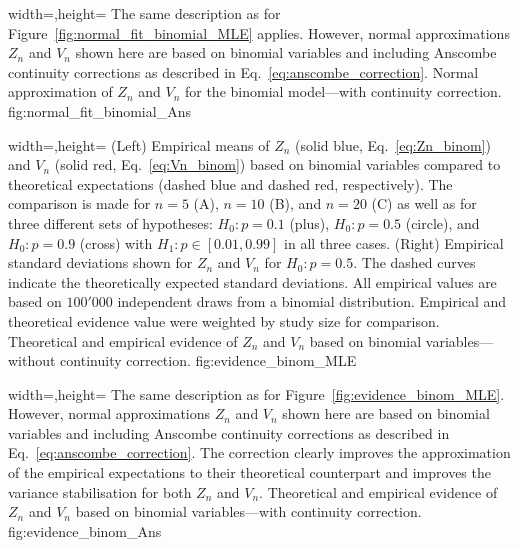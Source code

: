   {width=\textwidth,height=\textheight}%
  {The same description as for Figure~\ref{fig:normal_fit_binomial_MLE} applies. However, normal approximations $Z_n$ and $V_n$ shown here are based on binomial variables and including Anscombe continuity corrections as described in Eq.~\ref{eq:anscombe_correction}.}%
  {Normal approximation of $Z_n$ and $V_n$ for the binomial model---with continuity correction.}%
  {fig:normal_fit_binomial_Ans}%

  {width=\textwidth,height=\textheight}%
  {(Left) Empirical means of $Z_n$ (solid blue, Eq.~\ref{eq:Zn_binom}) and $V_n$ (solid red, Eq.~\ref{eq:Vn_binom}) based on binomial variables compared to theoretical expectations (dashed blue and dashed red, respectively). The comparison is made for $n=5$ (A), $n=10$ (B), and $n=20$ (C) as well as for three different sets of hypotheses: ${H_0: p=0.1}$ (plus), ${H_0: p=0.5}$ (circle), and ${H_0: p=0.9}$ (cross) with ${H_1: p \in [0.01,0.99]}$ in all three cases. (Right) Empirical standard deviations shown for $Z_n$ and $V_n$ for ${H_0: p=0.5}$. The dashed curves indicate the theoretically expected standard deviations. All empirical values are based on $100'000$ independent draws from a binomial distribution. Empirical and theoretical evidence value were weighted by study size for comparison.}%
  {Theoretical and empirical evidence of $Z_n$ and $V_n$ based on binomial variables---without continuity correction.}%
  {fig:evidence_binom_MLE}%

  {width=\textwidth,height=\textheight}%
  {The same description as for Figure~\ref{fig:evidence_binom_MLE}. However, normal approximations $Z_n$ and $V_n$ shown here are based on binomial variables and including Anscombe continuity corrections as described in Eq.~\ref{eq:anscombe_correction}. The correction clearly improves the approximation of the empirical expectations to their theoretical counterpart and improves the variance stabilisation for both $Z_n$ and $V_n$.}%
  {Theoretical and empirical evidence of $Z_n$ and $V_n$ based on binomial variables---with continuity correction.}%
  {fig:evidence_binom_Ans}%

